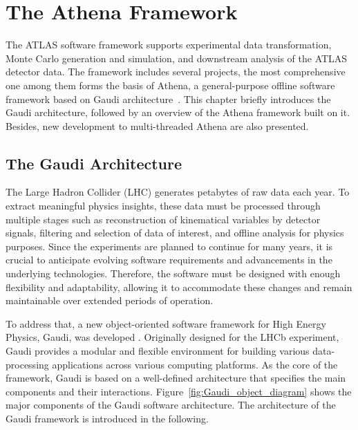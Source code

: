 \chapter{The Athena Framework} \label{ch:Athena}
The ATLAS software framework supports experimental data transformation, Monte Carlo generation and simulation, and downstream analysis of the ATLAS detector data. The framework includes several projects, the most comprehensive one among them forms the basis of Athena, a general-purpose offline software framework based on Gaudi architecture~\cite{ATLAScomputing2025}. This chapter briefly introduces the Gaudi architecture, followed by an overview of the Athena framework built on it. Besides, new development to multi-threaded Athena are also presented.
\section{The Gaudi Architecture} \label{sec:Gaudi}
The Large Hadron Collider (LHC) generates petabytes of raw data each year. To extract meaningful physics insights, these data must be processed through multiple stages such as reconstruction of kinematical variables by detector signals, filtering and selection of data of interest, and offline analysis for physics purposes. Since the experiments are planned to continue for many years, it is crucial to anticipate evolving software requirements and advancements in the underlying technologies. Therefore, the software must be designed with enough flexibility and adaptability, allowing it to accommodate these changes and remain maintainable over extended periods of operation.

To address that, a new object-oriented software framework for High Energy Physics, Gaudi, was developed \cite{Gaudi}. Originally designed for the LHCb experiment, Gaudi provides a modular and flexible environment for building various data-processing applications across various computing platforms. As the core of the framework, Gaudi is based on a well-defined architecture that specifies the main components and their interactions. Figure~\ref{fig:Gaudi_object_diagram} shows the major components of the Gaudi software architecture. The architecture of the Gaudi framework is introduced in the following.

